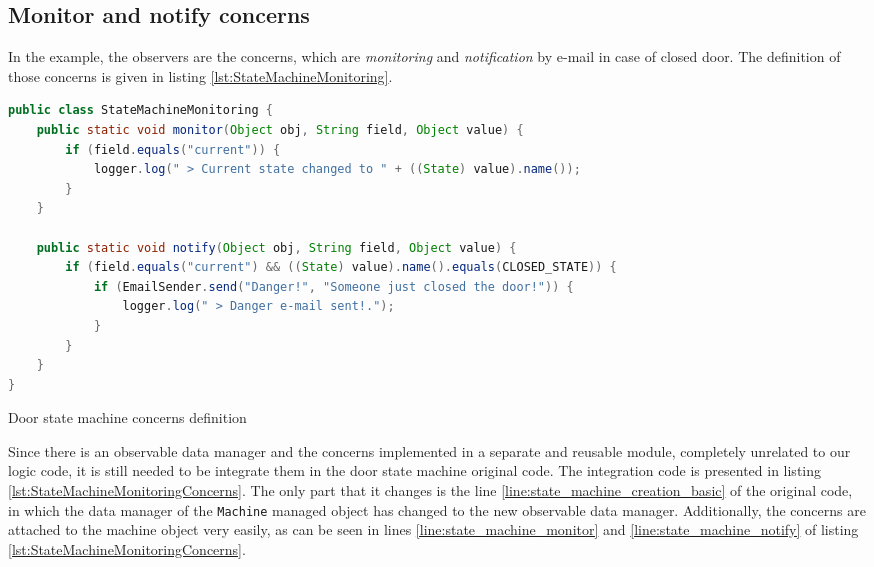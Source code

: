 \subsection{Monitor and notify concerns}
In the example, the observers are the concerns, which are \textit{monitoring} and \textit{notification} by e-mail in case of closed door. 
The definition of those concerns is given in listing \ref{lst:StateMachineMonitoring}.

\begin{sourcecode} [H]
	\begin{lstlisting}[language=Java, escapechar=|]
public class StateMachineMonitoring {
    public static void monitor(Object obj, String field, Object value) {
        if (field.equals("current")) {
            logger.log(" > Current state changed to " + ((State) value).name());
        }
    }

    public static void notify(Object obj, String field, Object value) {
        if (field.equals("current") && ((State) value).name().equals(CLOSED_STATE)) {
            if (EmailSender.send("Danger!", "Someone just closed the door!")) {
            	logger.log(" > Danger e-mail sent!.");
            }
        }
    }
}
	\end{lstlisting}
	\caption{Door state machine concerns definition}
	\label{lst:StateMachineMonitoring}
\end{sourcecode}

Since there is an observable data manager and the concerns implemented in a separate and reusable module, completely unrelated to our logic code, it is still needed to be integrate them in the door state machine original code.
The integration code is presented in listing \ref{lst:StateMachineMonitoringConcerns}.
The only part that it changes is the line \ref{line:state_machine_creation_basic} of the original code, in which the data manager of the \texttt{Machine} managed object has changed to the new observable data manager.
Additionally, the concerns are attached to the machine object very easily, as can be seen in lines \ref{line:state_machine_monitor} and \ref{line:state_machine_notify} of listing \ref{lst:StateMachineMonitoringConcerns}.


